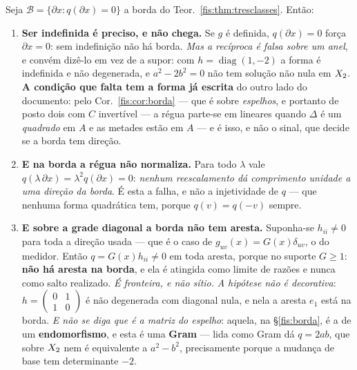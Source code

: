 \documentclass[livro.tex]{subfiles}
\begin{document}
\begin{teorema}\label{fis:thm:borda}
Seja $\mathcal{B}=\{\partial x: q(\partial x)=0\}$ a borda do
Teor.~\ref{fis:thm:tresclasses}. Então:
\begin{enumerate}\itemsep3pt
\item[(1)] \textbf{Ser indefinida é preciso, e não chega.} Se $g$ é definida,
$q(\partial x)=0$ força $\partial x=0$: sem indefinição não há borda. \emph{Mas a
recíproca é falsa sobre um anel}, e convém dizê-lo em vez de a supor: com
$h=\operatorname{diag}(1,-2)$ a forma é indefinida e não degenerada, e
$a^{2}-2b^{2}=0$ não tem solução não nula em $X_2$. \textbf{A condição que falta
tem a forma já escrita} do outro lado do documento: pelo Cor.~\ref{fis:cor:borda}
--- que é sobre \emph{espelhos}, e portanto de posto dois com $C$ invertível ---
a régua parte-se em lineares quando $\Delta$ é um \emph{quadrado} em $A$ e as
metades estão em $A$ ---
e é isso, e não o sinal, que decide se a borda tem direção.
\item[(2)] \textbf{E na borda a régua não normaliza.} Para todo $\lambda$ vale
$q(\lambda\,\partial x)=\lambda^{2}q(\partial x)=0$: \emph{nenhum reescalamento dá
comprimento unidade a uma direção da borda}. É esta a falha, e não a
injetividade de $q$ --- que nenhuma forma quadrática tem, porque $q(v)=q(-v)$
sempre.
\item[(3)] \textbf{E sobre a grade diagonal a borda não tem aresta.} Suponha-se
$h_{ii}\neq0$ para toda a direção usada --- que é o caso de
$g_{uv}(x)=G(x)\delta_{uv}$, o do medidor. Então $q=G(x)h_{ii}\neq0$ em toda
aresta, porque no suporte $G\ge1$: \textbf{não há aresta na borda}, e ela é
atingida como limite de razões e nunca como salto realizado. \emph{É fronteira,
e não sítio.} \emph{A hipótese não é decorativa}: $h=\left(\begin{smallmatrix}0&1\\1&0\end{smallmatrix}\right)$
é não degenerada com diagonal nula, e nela a aresta $e_1$ está na borda. \emph{E
não se diga que é a matriz do espelho}: aquela, na §\ref{fis:borda}, é a de um
\textbf{endomorfismo}, e esta é uma \textbf{Gram} --- lida como Gram dá $q=2ab$,
que sobre $X_2$ nem é equivalente a $a^{2}-b^{2}$, precisamente porque a mudança
de base tem determinante $-2$.
\end{enumerate}
\end{teorema}
\end{document}
